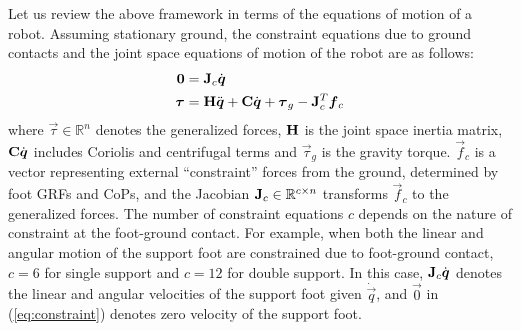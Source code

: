 \documentclass{llncs}
\newcommand{\skewsym}[1] {[#1]_{\times}}
\newcommand{\vom} {\boldsymbol{\omega}}
\newcommand{\vup} {\boldsymbol{\upsilon}}
\newcommand {\mat}[1] {{\bf #1}}
\newcommand{\mC} {\mat{C}}
\newcommand{\mH} {\mat{H}}
\newcommand{\mJ} {\mat{J}}
\newcommand{\mR} {\mat{R}}
\newcommand{\mT} {\mat{T}}
\newcommand \se     {\mathrm{se}}
\newcommand \SE     {\mathrm{SE}}
\newcommand{\sv} {{\bf v}} %
\newcommand{\vth} {\boldsymbol{\theta}}
\newcommand{\SO} {\mathsf{SO(3)}}
\newcommand{\real} {\mathbb{R}}
\newcommand{\vdth} {\boldsymbol{\dot{\theta}}}
\newcommand{\vp}{\vec{p}}
\newcommand{\vtau}{\vec{\tau}}
\newcommand{\vzero}{{\vec{0}}}
\newcommand{\vf}{\vec{f}}
\newcommand{\vq}{\vec{q}}
\newcommand{\vdq} {\dot{\vec{q}}}
\newcommand{\vddq} {\ddot{\vec{q}}}
\begin{document}

Let us review the above framework in terms of the equations of motion of a robot.
Assuming stationary ground, the constraint equations due to ground contacts and
the joint space equations of motion of the robot are as follows:
\begin{align}
	\vzero &= \mJ_c \vdq\label{eq:constraint}	\\
	\vtau &= \mH \vddq + \mC\vdq + \vtau_g - \mJ_c^T\vf_c \label{eq:joint_space_eom}
\end{align}	
where $\vtau \in \real^{n}$ denotes the generalized forces,
$\mH$ is the joint space inertia matrix, $\mC\vdq$ includes Coriolis and centrifugal terms
and $\vtau_g$ is the gravity torque.
$\vf_c$ is a vector representing external ``constraint'' forces from the ground,
determined by foot GRFs and CoPs, and the Jacobian $\mJ_c\in\real^{c\times n}$ transforms $\vf_c$ to the generalized forces. The number of constraint equations $c$ depends on the nature of constraint at the foot-ground contact.
For example, when both the linear and angular motion of the support foot are constrained due to foot-ground contact,
$c=6$ for single support and $c=12$ for double support. In this case, $\mJ_c\vdq$ denotes
the linear and angular velocities of the support foot given $\vdq$, and $\vzero$ in (\ref{eq:constraint})
denotes zero velocity of the support foot.
\end{document}
